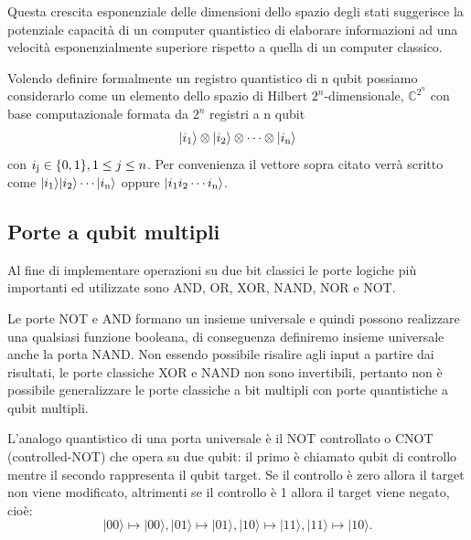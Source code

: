 Questa crescita esponenziale delle dimensioni dello spazio degli stati suggerisce la potenziale capacità di un computer quantistico di elaborare informazioni ad una velocità esponenzialmente superiore rispetto a quella di un computer classico.

Volendo definire formalmente un registro quantistico di n qubit possiamo considerarlo come un elemento dello spazio di Hilbert $2^n$-dimensionale, $\mathbb{C}^{{2}^n}$ con base computazionale formata da $2^n$ registri a n qubit
\begin{equation}
    |i\textsubscript{1}\rangle\otimes|i\textsubscript{2}\rangle\otimes \dotsm \otimes|i\textsubscript{n}\rangle
\end{equation}
con $i\textsubscript{j}\in\{0,1\}, 1 \leq j \leq n$.
Per convenienza il vettore sopra citato verrà scritto come $|i\textsubscript{1}\rangle|i\textsubscript{2}\rangle \dotsm |i\textsubscript{n}\rangle$ oppure $|i\textsubscript{1}i\textsubscript{2} \dotsm i\textsubscript{n}\rangle$.

\subsection{Porte a qubit multipli}
Al fine di implementare operazioni su due bit classici le porte logiche più importanti ed utilizzate sono AND, OR, XOR, NAND, NOR e NOT.

Le porte NOT e AND formano un insieme universale e quindi possono realizzare una qualsiasi funzione booleana, di conseguenza definiremo insieme universale anche la porta NAND.
Non essendo possibile risalire agli input a partire dai risultati, le porte classiche XOR e NAND non sono invertibili, pertanto non è possibile generalizzare le porte classiche a bit multipli con porte quantistiche a qubit multipli.

L'analogo quantistico di una porta universale è il NOT controllato o CNOT (controlled-NOT) che opera su due qubit: il primo è chiamato qubit di controllo mentre il secondo rappresenta il qubit target.
Se il controllo è zero allora il target non viene modificato, altrimenti se il controllo è 1 allora il target viene negato, cioè:
\begin{equation}
    |00\rangle\mapsto|00\rangle, |01\rangle\mapsto|01\rangle, |10\rangle\mapsto|11\rangle, |11\rangle\mapsto|10\rangle.
\end{equation}

